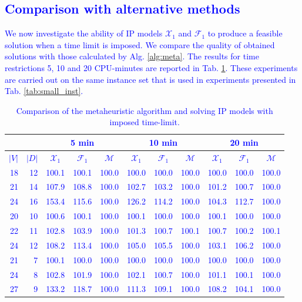 \textcolor{blue}{\subsection{Comparison with alternative methods}}
\textcolor{blue}{
We now investigate the ability of IP models $\mathcal{X}_1$ and $\mathcal{F}_1$ to produce a feasible solution when a time limit is imposed.
We compare the quality of obtained solutions with those calculated by Alg. \ref{alg:meta}.
The results for time restrictions 5, 10 and 20 CPU-minutes are reported in Tab. \ref{tab:metamod}.
These experiments are carried out on the same instance set that is used in experiments presented in Tab. \ref{tab:small_inst}. 
}
\begin{table}[]
\centering
\setlength{\tabcolsep}{6pt} %
\renewcommand{\arraystretch}{1.4} %
\textcolor{blue}{
\begin{tabular}{rrrrrrrrrrr}
\multicolumn{1}{l}{}      & \multicolumn{1}{l}{}      & \multicolumn{3}{c}{5 min}  & \multicolumn{3}{c}{10 min} & \multicolumn{3}{c}{20 min}     \\\hline
\multicolumn{1}{l}{$|V|$} & \multicolumn{1}{l}{$|D|$} & \multicolumn{1}{c}{$\mathcal{X}_1$} & \multicolumn{1}{c}{$\mathcal{F}_1$} & \multicolumn{1}{c}{$\mathcal{M}$} & \multicolumn{1}{c}{$\mathcal{X}_1$} & \multicolumn{1}{c}{$\mathcal{F}_1$} & \multicolumn{1}{c}{$\mathcal{M}$} & \multicolumn{1}{c}{$\mathcal{X}_1$} & \multicolumn{1}{c}{$\mathcal{F}_1$} & \multicolumn{1}{c}{$\mathcal{M}$} \\
\hline
18  & 12   &100.1&100.1&100.0&100.0&100.0&100.0&100.0&100.0&100.0\\
21  & 14   &107.9&108.8&100.0&102.7&103.2&100.0&101.2&100.7&100.0\\
24  & 16   &153.4&115.6&100.0&126.2&114.2&100.0&104.3&112.7&100.0\\     
\hline
20  & 10   &100.6&100.1&100.0&100.1&100.0&100.0&100.1&100.0&100.0\\
22  & 11   &102.8&103.9&100.0&101.3&100.7&100.1&100.7&100.2&100.1\\
24  & 12   &108.2&113.4&100.0&105.0&105.5&100.0&103.1&106.2&100.0\\                               
\hline
21  & 7    &100.1&100.0&100.0&100.0&100.0&100.0&100.0&100.0&100.0\\
24  & 8    &102.8&101.9&100.0&102.1&100.7&100.0&101.1&100.1&100.0\\
27  & 9    &133.2&118.7&100.0&111.3&109.1&100.0&108.2&104.1&100.0                                  
\end{tabular}
}
\caption{\textcolor{blue}{Comparison of the metaheuristic algorithm and solving IP models with imposed time-limit.}}
\label{tab:metamod}
\end{table}

